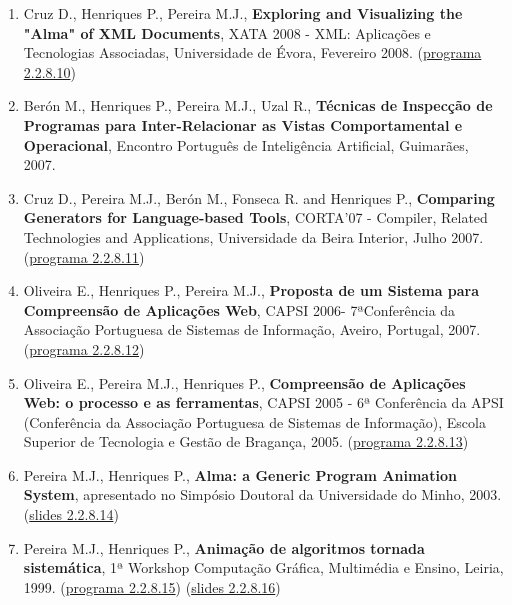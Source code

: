 \documentclass[11pt]{article}
\begin{document}
\begin{enumerate}
\item {Cruz D., Henriques P., Pereira M.J., {\bf{ Exploring and Visualizing the "Alma" of XML Documents}}, XATA 2008 - XML: Aplicações e Tecnologias Associadas, Universidade de Évora, Fevereiro 2008. (\href{run:ComunicacoesOrais/programas/XATA2008.pdf}{programa 2.2.8.10})}

\item {Berón M., Henriques P., Pereira M.J., Uzal R., {\bf{ Técnicas de Inspecção de Programas para Inter-Relacionar as Vistas Comportamental e Operacional}}, Encontro Português de Inteligência Artificial, Guimarães, 2007.}

\item {Cruz D., Pereira M.J., Berón M., Fonseca R. and Henriques P., {\bf{ Comparing Generators for Language-based Tools}}, CORTA'07 - Compiler, Related Technologies and Applications, Universidade da Beira Interior, Julho 2007. (\href{run:ComunicacoesOrais/programas/CoRTA2007prog.pdf}{programa 2.2.8.11})}

\item {Oliveira E., Henriques P., Pereira M.J., {\bf{ Proposta de um Sistema para Compreensão de Aplicações Web}}, CAPSI 2006- 7ªConferência da Associação Portuguesa de Sistemas de Informação, Aveiro, Portugal, 2007. (\href{run:ComunicacoesOrais/programas/CAPSI2006.pdf}{programa 2.2.8.12})}

\item {Oliveira E., Pereira M.J., Henriques P., {\bf{ Compreensão de Aplicações Web: o processo e as ferramentas}}, CAPSI 2005 - 6ª Conferência da APSI (Conferência da Associação Portuguesa de Sistemas de Informação), Escola Superior de Tecnologia e Gestão de Bragança, 2005. (\href{run:ComunicacoesOrais/programas/CAPSI2005.pdf}{programa 2.2.8.13})}

\item {Pereira M.J., Henriques P., {\bf{ Alma: a Generic Program Animation System}}, apresentado no Simpósio Doutoral da Universidade do Minho, 2003.  (\href{run:ComunicacoesOrais/SimDoutoralapres.pdf}{slides 2.2.8.14})}

\item {Pereira M.J., Henriques P., {\bf{ Animação de algoritmos tornada sistemática}}, 1ª Workshop Computação Gráfica, Multimédia e Ensino, Leiria, 1999. (\href{run:ComunicacoesOrais/programas/CGME1999.pdf}{programa 2.2.8.15}) (\href{run:ComunicacoesOrais/cgme99apres.pdf}{slides 2.2.8.16})}

\end{enumerate}
\end{document}

